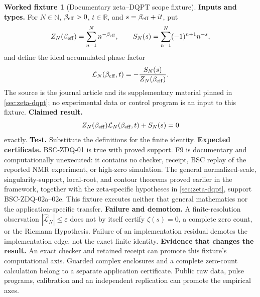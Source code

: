 \documentclass[11pt,a4paper]{article}
\theoremstyle{definition}
\newtheorem{fixture}[definition]{Worked fixture}
\theoremstyle{plain}
\theoremstyle{remark}
\begin{document}
\begin{fixture}[Documentary zeta--DQPT scope fixture]\label{fix:zdq}
\textbf{Inputs and types.}
For \(N\in\mathbb N\), \(\beta_{\rm eff}>0\), \(t\in\mathbb R\), and
\(s=\beta_{\rm eff}+it\), put
\[
 Z_N(\beta_{\rm eff})=\sum_{n=1}^{N}n^{-\beta_{\rm eff}},\qquad
 S_N(s)=\sum_{n=1}^{N}(-1)^{n+1}n^{-s},
\]
and define the ideal accumulated phase factor
\[
 \mathcal L_N(\beta_{\rm eff},t)=-\frac{S_N(s)}
 {Z_N(\beta_{\rm eff})}.
\]
The source is the journal article and its supplementary material pinned in
\cref{sec:zeta-dqpt}; no experimental data or control program is an input to
this fixture.
\textbf{Claimed result.}
\[
 Z_N(\beta_{\rm eff})\mathcal L_N(\beta_{\rm eff},t)+S_N(s)=0
\]
exactly.
\textbf{Test.}  Substitute the definitions for the finite identity.
\textbf{Expected certificate.}  BSC-ZDQ-01 is true with proved support.
F9 is documentary and computationally unexecuted: it contains no checker,
receipt, BSC replay of the reported NMR experiment, or high-zero simulation.
The general normalized-scale, singularity-support, local-root, and contour
theorems proved earlier in the framework, together with the zeta-specific
hypotheses in \cref{sec:zeta-dqpt}, support BSC-ZDQ-02a--02e.  This fixture executes
neither that general mathematics nor the application-specific transfer.
\textbf{Failure and demotion.}  A finite-resolution observation
\(|\widehat{\mathcal L}_N|\le\varepsilon\) does not by itself certify
\(\zeta(s)=0\), a complete zero count, or the Riemann Hypothesis.  Failure of an
implementation residual demotes the implementation edge, not the exact finite
identity.
\textbf{Evidence that changes the result.}  An exact checker and retained
receipt can promote this fixture's computational axis.  Guarded complex
enclosures and a complete zero-count calculation belong to a separate
application certificate.  Public raw data, pulse programs, calibration and an
independent replication can promote the empirical axes.
\end{fixture}
\end{document}
